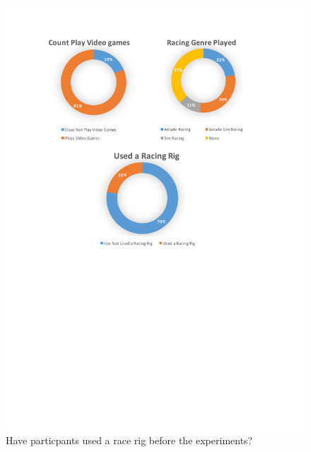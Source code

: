 \begin{figure}
	\centering
	\begin{minipage}{0.45\textwidth}
		\centering
		\includegraphics[width=\textwidth]{charts/usedARacingRig.pdf}
		\caption[Have particpants used a race rig?]{Have particpants used a race rig before the experiments?}
		\label{fig:chart-usedARacingRig}
	\end{minipage}\hfill
	\begin{minipage}{0.45\textwidth}
		\centering

\end{minipage}
\end{figure}
